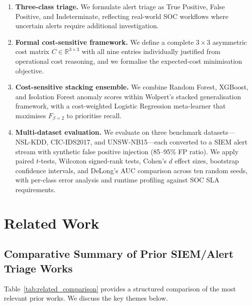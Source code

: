 \documentclass[conference]{IEEEtran}
\begin{document}
\begin{enumerate}
  \item \textbf{Three-class triage.}  We formulate alert triage as True Positive,
    False Positive, and Indeterminate, reflecting real-world SOC workflows where
    uncertain alerts require additional investigation.
  \item \textbf{Formal cost-sensitive framework.}  We define a complete $3\!\times\!3$
    asymmetric cost matrix $C \in \mathbb{R}^{3\times3}$ with all nine entries
    individually justified from operational cost reasoning, and we formalise the
    expected-cost minimisation objective.
  \item \textbf{Cost-sensitive stacking ensemble.}  We combine Random Forest,
    XGBoost, and Isolation Forest anomaly scores within Wolpert's stacked
    generalisation framework, with a cost-weighted Logistic Regression meta-learner
    that maximises $F_{\beta=2}$ to prioritise recall.
  \item \textbf{Multi-dataset evaluation.}  We evaluate on three benchmark
    datasets---NSL-KDD, CIC-IDS2017, and UNSW-NB15---each converted to a SIEM
    alert stream with synthetic false positive injection (85--95\% FP ratio).
    We apply paired $t$-tests, Wilcoxon signed-rank tests, Cohen's $d$ effect
    sizes, bootstrap confidence intervals, and DeLong's AUC comparison across
    ten random seeds, with per-class error analysis and runtime profiling
    against SOC SLA requirements.
\end{enumerate}

\section{Related Work}
\label{sec:related}

\subsection{Comparative Summary of Prior SIEM/Alert Triage Works}

Table~\ref{tab:related_comparison} provides a structured comparison of the most
relevant prior works.  We discuss the key themes below.
\end{document}
